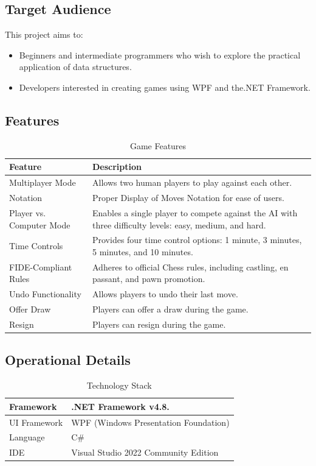 \documentclass[a4paper,12pt]{article}
\begin{document}
\subsection{Target Audience}
This project aims to:
\begin{itemize}
    \item Beginners and intermediate programmers who wish to explore the practical application of data structures.
    \item Developers interested in creating games using WPF and the.NET Framework.
\end{itemize}

\subsection{Features}
\begin{longtable}{|p{}|p{}|}
    \caption{Game Features}
    \hline
    \textbf{Feature} & \textbf{Description} \\
    \hline
    Multiplayer Mode & Allows two human players to play against each other. \\
    \hline
    Notation & Proper Display of Moves Notation for ease of users. \\
    \hline
    Player vs. Computer Mode & Enables a single player to compete against the AI with three difficulty levels: easy, medium, and hard. \\
    \hline
    Time Controls & Provides four time control options: 1 minute, 3 minutes, 5 minutes, and 10 minutes. \\
    \hline
    FIDE-Compliant Rules & Adheres to official Chess rules, including castling, en passant, and pawn promotion. \\
    \hline
    Undo Functionality & Allows players to undo their last move. \\
    \hline
    Offer Draw & Players can offer a draw during the game. \\
    \hline
    Resign & Players can resign during the game. \\
    \hline
\end{longtable}

\subsection{Operational Details}
\begin{longtable}{|p{}|p{}|}
    \caption{Technology Stack}
    \hline
    Framework & .NET Framework v4.8. \\
    \hline
    UI Framework & WPF (Windows Presentation Foundation)   \\
    \hline
    Language & C\# \\
    \hline
    IDE & Visual Studio 2022 Community Edition \\
    \hline
\end{longtable}
\end{document}

